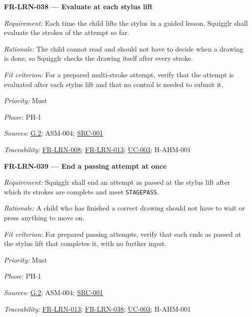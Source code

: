 \documentclass[12pt]{article}
\renewcommand{\_}{\textunderscore\allowbreak}%
\newcommand{\goalref}[1]{\hyperref[goal:#1]{G.#1}}
\newcommand{\ucref}[1]{\hyperref[uc:#1]{\mbox{UC-#1}}}
\newenvironment{srsrequirement}[2]{%
  \par\medskip\noindent\phantomsection\label{req:#1}%
  \textbf{#1 --- #2}\par\nobreak\smallskip }{\par\medskip}
\newcommand{\reqfield}[2]{\noindent\textit{#1:} #2\par}
\newcommand{\reqshall}[1]{\reqfield{Requirement}{#1}}
\newcommand{\reqrationale}[1]{\reqfield{Rationale}{#1}}
\newcommand{\reqfit}[1]{\reqfield{Fit criterion}{#1}}
\newcommand{\reqpriority}[1]{\reqfield{Priority}{#1}}
\newcommand{\reqphase}[1]{\reqfield{Phase}{#1}}
\newcommand{\reqsources}[1]{\reqfield{Sources}{#1}}
\newcommand{\reqtraces}[1]{\reqfield{Traceability}{#1}}
\newcommand{\reqref}[1]{\hyperref[req:#1]{#1}}
\newcommand{\srcref}[1]{\hyperref[src:#1]{SRC-#1}}
\providecommand{\ucref}[1]{\hyperref[uc:#1]{UC-#1}}
\begin{document}
\begin{srsrequirement}{FR-LRN-038}{Evaluate at each stylus lift}
  \reqshall{Each time the child lifts the stylus in a guided lesson, Squigglr
shall evaluate the strokes of the attempt so far.} \reqrationale{The child
cannot read and should not have to decide when a drawing is done, so Squigglr
checks the drawing itself after every stroke.} \reqfit{For a prepared
multi-stroke attempt, verify that the attempt is evaluated after each stylus
lift and that no control is needed to submit it.}
  \reqpriority{Must}
  \reqphase{PH-1}
  \reqsources{\goalref{2}; ASM-004; \srcref{001}}
  \reqtraces{\reqref{FR-LRN-008}; \reqref{FR-LRN-013}; \ucref{003}; H-AHM-001}
\end{srsrequirement}

\begin{srsrequirement}{FR-LRN-039}{End a passing attempt at once}
  \reqshall{Squigglr shall end an attempt as passed at the stylus lift after
which its strokes are complete and meet \texttt{STAGE\_PASS}.}
\reqrationale{A child who has finished a correct drawing should not have to
wait or press anything to move on.} \reqfit{For prepared passing attempts,
verify that each ends as passed at the stylus lift that completes it, with no
further input.}
  \reqpriority{Must}
  \reqphase{PH-1}
  \reqsources{\goalref{2}; ASM-004; \srcref{001}}
  \reqtraces{\reqref{FR-LRN-013}; \reqref{FR-LRN-038}; \ucref{003}; H-AHM-001}
\end{srsrequirement}
\end{document}
